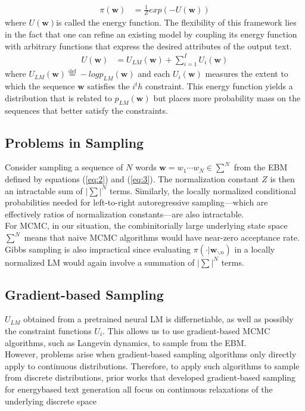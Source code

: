 \documentclass{article}
\newcommand*{\defeq}{\stackrel{\text{def}}{=}}
\begin{document}
\begin{align}
    \pi(\boldsymbol{w}) & = \frac{1}{Z}exp(-U(\boldsymbol{w})) \label{eq:2}
\end{align}
where $U(\boldsymbol{w})$is called the energy function. The flexibility
of this framework lies in the fact that one can refine an
existing model by coupling its energy function with arbitrary
functions that express the desired attributes of the output
text.
\begin{align}
    U(\boldsymbol{w}) & = U_{LM}(\boldsymbol{w}) + \sum_{i=1}^{I}U_i(\boldsymbol{w}) \label{eq:3}
\end{align}
where $U_{LM}(\boldsymbol{w}) \defeq -log p_{LM}(\boldsymbol{w})$ and each $U_i(\boldsymbol{w})$ measures the extent to which the sequence $\boldsymbol{w}$ satisfies the $i^th$ constraint. This energy function yields a distribution that is related to $p_{LM}(\boldsymbol{w})$ but places more probability
mass on the sequences that better satisfy the constraints.


\subsection{Problems in Sampling}
Consider sampling a sequence of $N$ words $\boldsymbol{w} = w_1 \cdots w_N \in \sum^{N}$ from the EBM defined by equations (\ref*{eq:2}) and (\ref*{eq:3}). The normalization constant $Z$ is then an intractable sum of $|\sum|^N$ terms. Similarly, the locally normalized conditional probabilities
needed for left-to-right autoregressive sampling—which are
effectively ratios of normalization constants—are also intractable. \\
For MCMC, in our situation, the combinitorially large underlying state space  $\sum^N$ means that naive MCMC algorithms would have near-zero acceptance rate. Gibbs sampling is also impractical since evaluating $\pi(\cdot|\boldsymbol{w}_{\backslash n})$ in a locally normalized LM would again involve a summation of $|\sum|^N$ terms.

\subsection{Gradient-based Sampling}
$U_{LM}$ obtained from a pretrained neural LM is differnetiable, as well as possibly the constraint functions $U_i$. This allows us to use gradient-based MCMC algorithms, such as Langevin dynamics, to sample from the EBM. \\
However, problems arise when gradient-based sampling algorithms only directly apply to continuous distributions. Therefore, to apply such algorithms to sample from discrete distributions, prior
works that developed gradient-based sampling for energybased text generation all focus on continuous relaxations
of the underlying discrete space
\end{document}

